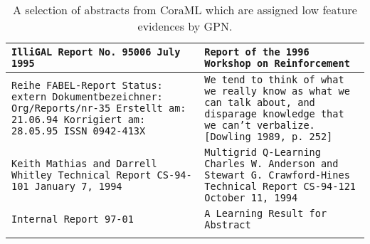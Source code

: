 \begin{table}[!h]
    \centering
    \tiny
    \begin{tabular}{p{6.5cm} p{6.5cm}}
        \toprule
        {\tt IlliGAL Report No. 95006 July 1995} & 
        {\tt Report of the 1996 Workshop on Reinforcement} \\
        \midrule
        {\tt Reihe FABEL-Report Status: extern Dokumentbezeichner: Org/Reports/nr-35 Erstellt am: 21.06.94 Korrigiert am: 28.05.95 ISSN 0942-413X} & 
        {\tt We tend to think of what we really know as what we can talk about, and disparage knowledge that we can't verbalize. [Dowling 1989, p. 252]} \\
        \midrule
        {\tt Keith Mathias and Darrell Whitley Technical Report CS-94-101 January 7, 1994} & 
        {\tt Multigrid Q-Learning Charles W. Anderson and Stewart G. Crawford-Hines Technical Report CS-94-121 October 11, 1994} \\
        \midrule
        {\tt Internal Report 97-01} & {\tt A Learning Result for Abstract} \\
        \bottomrule
        \vspace{0.1cm}
    \end{tabular}
    \caption{A selection of abstracts from CoraML which are assigned low feature evidences by GPN.}
    \label{tab:odd_abstracts}
    \vspace{-3mm}
\end{table}